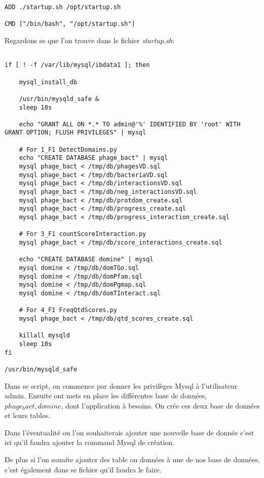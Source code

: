 \begin{lstlisting}[frame=single]
ADD ./startup.sh /opt/startup.sh

CMD ["/bin/bash", "/opt/startup.sh"]
\end{lstlisting}

Regardons se que l'on trouve dans le fichier \emph{startup.sh}:

\begin{lstlisting}[frame=single]

if [ ! -f /var/lib/mysql/ibdata1 ]; then

	mysql_install_db

	/usr/bin/mysqld_safe &
	sleep 10s

	echo "GRANT ALL ON *.* TO admin@'%' IDENTIFIED BY 'root' WITH GRANT OPTION; FLUSH PRIVILEGES" | mysql

	# For 1_F1 DetectDomains.py
	echo "CREATE DATABASE phage_bact" | mysql
	mysql phage_bact < /tmp/db/phagesVD.sql
	mysql phage_bact < /tmp/db/bacteriaVD.sql
	mysql phage_bact < /tmp/db/interactionsVD.sql
	mysql phage_bact < /tmp/db/neg_interactionsVD.sql
	mysql phage_bact < /tmp/db/protdom_create.sql
	mysql phage_bact < /tmp/db/progress_create.sql
	mysql phage_bact < /tmp/db/progress_interaction_create.sql

    # For 3_F1 countScoreInteraction.py
	mysql phage_bact < /tmp/db/score_interactions_create.sql

	echo "CREATE DATABASE domine" | mysql
    mysql domine < /tmp/db/domTGo.sql
    mysql domine < /tmp/db/domPfam.sql
    mysql domine < /tmp/db/domPgmap.sql
    mysql domine < /tmp/db/domTInteract.sql

    # For 4_F1 FreqQtdScores.py
	mysql phage_bact < /tmp/db/qtd_scores_create.sql

	killall mysqld
	sleep 10s
fi

/usr/bin/mysqld_safe
\end{lstlisting}

Dans se script, on commence par donner les privilèges Mysql à l'utilisateur admin. Ensuite ont mets en place les différentes base de données, \emph{$phage_bact, domine$}, dont l'application à besoins. On crée ces deux base de données et leurs tables.

Dans l'éventualité ou l'on souhaiterais ajouter une nouvelle base de donnée c'est ici qu'il faudra ajouter la command Mysql de création.

De plus si l'on souaite ajouter des table ou données à une de nos base de données, c'est également dans se fichier qu'il faudra le faire.

